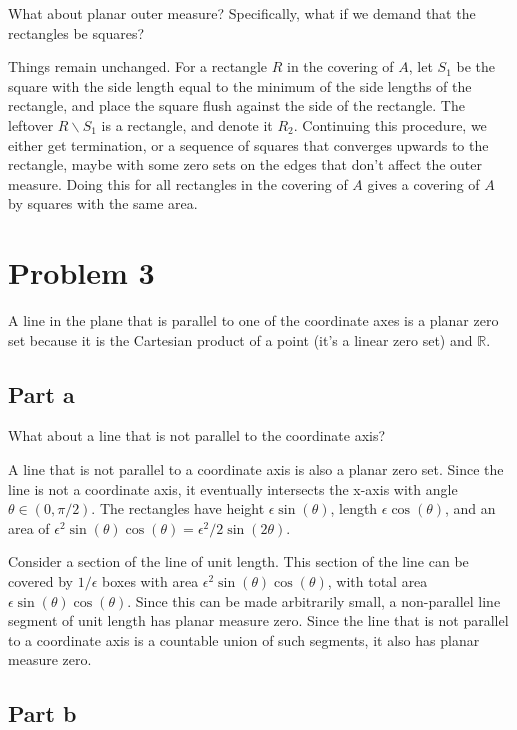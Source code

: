 \documentclass{article}
\newcommand{\R}{\mathbb{R}}
\begin{document}
What about planar outer measure? Specifically, what if we demand that the rectangles be squares?

Things remain unchanged. For a rectangle $R$ in the covering of $A$, let $S_1$ be the square with the side length equal to the minimum of the side lengths of the rectangle, and place the square flush against the side of the rectangle. The leftover $R\backslash S_1$ is a rectangle, and denote it $R_2$. Continuing this procedure, we either get termination, or a sequence of squares that converges upwards to the rectangle, maybe with some zero sets on the edges that don't affect the outer measure. Doing this for all rectangles in the covering of $A$ gives a covering of $A$ by squares with the same area.

\section*{Problem 3}

A line in the plane that is parallel to one of the coordinate axes is a planar zero set because it is the Cartesian product of a point (it's a linear zero set) and $\R$.

\subsection*{Part a}

What about a line that is not parallel to the coordinate axis?

A line that is not parallel to a coordinate axis is also a planar zero set. Since the line is not a coordinate axis, it eventually intersects the x-axis with angle $\theta \in (0, \pi/2)$. The rectangles have height $\epsilon \sin(\theta)$, length $\epsilon \cos(\theta)$, and an area of $\epsilon^2 \sin(\theta) \cos(\theta) = \epsilon^2/2 \sin(2\theta)$.

Consider a section of the line of unit length. This section of the line can be covered by $1/\epsilon$ boxes with area $\epsilon^2 \sin(\theta) \cos(\theta)$, with total area $\epsilon \sin(\theta) \cos(\theta)$. Since this can be made arbitrarily small, a non-parallel line segment of unit length has planar measure zero. Since the line that is not parallel to a coordinate axis is a countable union of such segments, it also has planar measure zero.

\subsection*{Part b}
\end{document}
